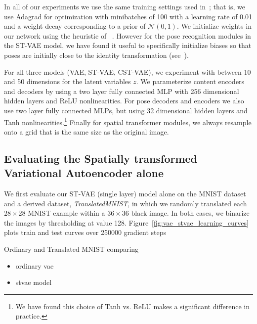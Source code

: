 
In all of our experiments we use the same training settings used in~\cite{Kingma2014}; that is,  
we use Adagrad for optimization with minibatches of 100  with a learning rate of 0.01
and a weight decay corresponding to a prior of $\mathcal{N}(0,1)$.
We initialize weights in our network using the heuristic of ~\cite{glorot2010understanding}.
However for the pose recognition modules in the ST-VAE model, we have found it useful to
specifically initialize biases so that poses are initially close to the identity transformation (see~\cite{jaderberg2015spatial}).

For all three models (VAE, ST-VAE, CST-VAE),
we experiment with between 10 and 50  dimensions for the latent variables $z$.
We parameterize content encoders and decoders
by using a two layer fully connected MLP with 256 dimensional
hidden layers and ReLU nonlinearities.
For pose decoders and encoders we also use two layer fully connected MLPs, but 
using 32 dimensional hidden layers and Tanh nonlinearities.\footnote{
%
We have found this choice of Tanh vs. ReLU makes a significant
difference in practice.
}
Finally for spatial transformer modules, we always resample onto a grid that is the same size as the original
image.



\subsection{Evaluating the Spatially transformed Variational Autoencoder alone}

We first evaluate our ST-VAE (single layer) model alone on the MNIST dataset~\citep{lecun1998gradient}
and a derived dataset, \emph{TranslatedMNIST}, in which we randomly translated each  $28\times 28$ MNIST example
within a $36\times 36$ black image.  In both cases, we binarize the images by thresholding at value 128.
Figure~\ref{fig:vae_stvae_learning_curves} plots train and test curves over 250000 gradient steps

Ordinary and Translated MNIST comparing
\begin{itemize}
\item ordinary vae
\item stvae model
\end{itemize}


